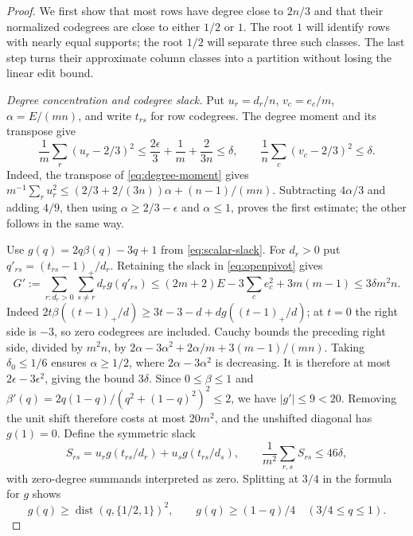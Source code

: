 \documentclass[11pt]{article}
\begin{document}
\begin{proof}
We first show that most rows have degree close to $2n/3$ and that their
normalized codegrees are close to either $1/2$ or $1$. The root $1$
will identify rows with nearly equal supports; the root $1/2$ will
separate three such classes. The last step turns their approximate
column classes into a partition without losing the linear edit bound.

\smallskip\noindent\emph{Degree concentration and codegree slack.}
Put $u_r=d_r/n$, $v_c=e_c/m$, $\alpha=E/(mn)$, and write $t_{rs}$
for row codegrees. The degree moment and its transpose give
\begin{equation}\label{eq:stabilitymoments}
 \frac1m\sum_r(u_r-2/3)^2
 \le\frac{2\epsilon}{3}+\frac1m+\frac{2}{3n}\le\delta,
 \qquad
 \frac1n\sum_c(v_c-2/3)^2\le\delta.
\end{equation}
Indeed, the transpose of \eqref{eq:degree-moment} gives
$m^{-1}\sum_r u_r^2\le(2/3+2/(3n))\alpha+(n-1)/(mn)$.
Subtracting $4\alpha/3$ and adding $4/9$, then using
$\alpha\ge2/3-\epsilon$ and $\alpha\le1$, proves the first estimate;
the other follows in the same way.

Use $g(q)=2q\beta(q)-3q+1$ from \eqref{eq:scalar-slack}.
For $d_r>0$ put $q'_{rs}=(t_{rs}-1)_+/d_r$. Retaining the slack in
\eqref{eq:openpivot} gives
\[
 G':=\sum_{r:d_r>0}\sum_{s\ne r}d_rg(q'_{rs})
 \le(2m+2)E-3\sum_c e_c^2+3m(m-1)
 \le3\delta m^2n.
\]
Indeed $2t\beta((t-1)_+/d)\ge3t-3-d+dg((t-1)_+/d)$;
at $t=0$ the right side is $-3$, so zero codegrees are included.
Cauchy bounds the preceding right side, divided by $m^2n$, by
$2\alpha-3\alpha^2+2\alpha/m+3(m-1)/(mn)$.
Taking $\delta_0\le1/6$ ensures $\alpha\ge1/2$, where
$2\alpha-3\alpha^2$ is decreasing. It is therefore at most
$2\epsilon-3\epsilon^2$, giving the bound $3\delta$.
Since $0\le\beta\le1$ and
$\beta'(q)=2q(1-q)/(q^2+(1-q)^2)^2\le2$, we have $|g'|\le9<20$.
Removing the unit shift therefore costs at most $20m^2$, and the
unshifted diagonal has $g(1)=0$.
Define the symmetric slack
\[
 S_{rs}=u_rg(t_{rs}/d_r)+u_sg(t_{rs}/d_s),
 \qquad \frac1{m^2}\sum_{r,s}S_{rs}\le46\delta,
\]
with zero-degree summands interpreted as zero.
Splitting at $3/4$ in the formula for $g$ shows
\begin{equation}\label{eq:stabilityscalar}
 g(q)\ge\operatorname{dist}(q,\{1/2,1\})^2,
 \qquad g(q)\ge(1-q)/4\quad(3/4\le q\le1).
\end{equation}


\end{proof}
\end{document}
